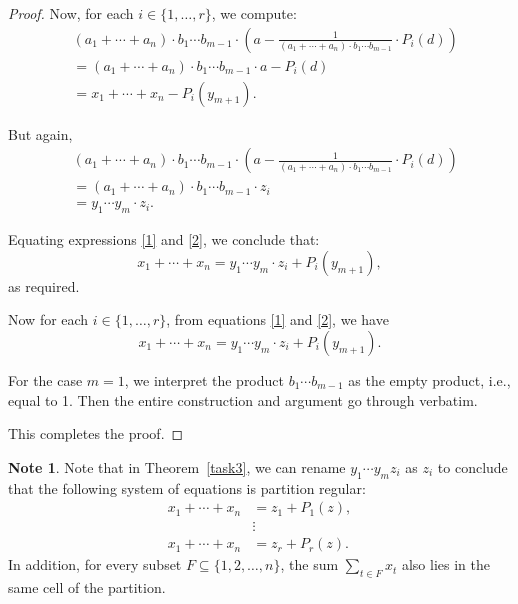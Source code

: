 \documentclass{article}
\theoremstyle{Theorem}
\theoremstyle{definition}
\newtheorem{note}[thm]{Note}
\begin{document}
\begin{proof}
 Now, for each \( i \in \{1, \ldots, r\} \), we compute:
\begin{align}
&(a_1 + \cdots + a_n)\cdot b_1 \cdots b_{m-1} \cdot \left( a - \frac{1}{(a_1 + \cdots + a_n)\cdot b_1 \cdots b_{m-1}} \cdot P_i(d) \right) \nonumber \\
&= (a_1 + \cdots + a_n)\cdot b_1 \cdots b_{m-1} \cdot a - P_i(d) \nonumber \\
&= x_1 + \cdots + x_n - P_i(y_{m+1}). \label{1}
\end{align}

But again,
\begin{align}
&(a_1 + \cdots + a_n)\cdot b_1 \cdots b_{m-1} \cdot \left( a - \frac{1}{(a_1 + \cdots + a_n)\cdot b_1 \cdots b_{m-1}} \cdot P_i(d) \right) \nonumber \\
&= (a_1 + \cdots + a_n)\cdot b_1 \cdots b_{m-1} \cdot z_i \nonumber \\
&= y_1 \cdots y_m \cdot z_i. \label{2}
\end{align}

Equating expressions \eqref{1} and \eqref{2}, we conclude that:
\[
x_1 + \cdots + x_n = y_1 \cdots y_m \cdot z_i + P_i(y_{m+1}),
\]
as required.

   Now for each \( i \in \{1,\ldots, r\} \), from equations \eqref{1} and \eqref{2}, we have
\[
x_1 + \cdots + x_n = y_1 \cdots y_m \cdot z_i + P_i(y_{m+1}).
\]

For the case \( m = 1 \), we interpret the product \( b_1 \cdots b_{m-1} \) as the empty product, i.e., equal to 1. Then the entire construction and argument go through verbatim.

\noindent This completes the proof.
\end{proof}



    

\begin{note}\label{note}
Note that in Theorem~\ref{task3}, we can rename \( y_1 \cdots y_m z_i \) as \( z_i \) to conclude that the following system of equations is partition regular:
\[
\begin{aligned}
x_1 + \cdots + x_n &= z_1 + P_1(z), \\
&\vdots \\
x_1 + \cdots + x_n &= z_r + P_r(z).
\end{aligned}
\]
In addition, for every subset \( F \subseteq \{1,2,\ldots,n\} \), the sum \( \sum_{t \in F} x_t \) also lies in the same cell of the partition.
\end{note}
\end{document}
